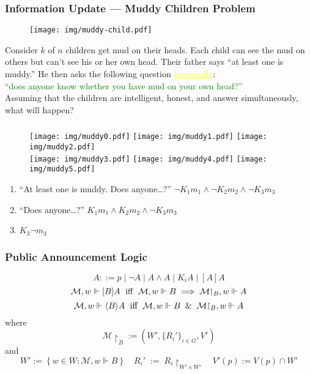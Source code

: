 \documentclass[UTF8,aspectratio=43,11pt,colorlinks,compress,openany]{beamer}%
\begin{document}
\begin{frame}\frametitle{Information Update --- Muddy Children Problem}
			\begin{figure}
				\texttt{[image: img/muddy-child.pdf]}
			\end{figure}\vspace{-1ex}
	\begin{problem}
		Consider $k$ of $n$ children get mud on their heads. Each child can see the mud on others but can't see his or her own head. Their father says ``at least one is muddy.'' He then asks the following question \textcolor{yellow}{\underline{repeatedly}}:\\
		\textcolor{green}{``does anyone know whether you have mud on your own head?''}\\
		Assuming that the children are intelligent, honest, and answer simultaneously, what will happen?
	\end{problem}
\end{frame}

\begin{frame}\frametitle{}
\begin{figure}[H]
\texttt{[image: img/muddy0.pdf]}
\texttt{[image: img/muddy1.pdf]}
\texttt{[image: img/muddy2.pdf]}\\
\texttt{[image: img/muddy3.pdf]}
\texttt{[image: img/muddy4.pdf]}\hspace*{2ex}
\texttt{[image: img/muddy5.pdf]}
\end{figure}
\begin{enumerate}
	\item ``At least one is muddy. Does anyone\dots?'' $\neg K_1m_1\wedge\neg K_2m_2\wedge\neg K_3m_3$
	\item ``Does anyone\dots?'' $K_1m_1\wedge K_2m_2\wedge\neg K_3m_3$
	\item $K_3\neg m_3$
\end{enumerate}
\end{frame}

\begin{frame}\frametitle{Public Announcement Logic}
\[A::=p\mid \neg A\mid A\wedge A\mid K_i A\mid [A]A\]
\[\mathcal{M},w\Vdash[B]A \mbox{\; iff \;} \mathcal{M},w\Vdash B\implies\mathcal{M}{\restriction_B},w\Vdash A\]
\[\mathcal{M},w\Vdash\langle B\rangle A \mbox{\; iff \;} \mathcal{M},w\Vdash B\;\;\&\;\;\mathcal{M}{\restriction_B},w\Vdash A\]
where
\[\mathcal{M}{\restriction_B}:=\left(W',\{R_i'\}_{i\in G},V'\right)\] and 
\[W':=\left\{w\in W: \mathcal{M},w\Vdash B\right\}\quad R_i'\;:=\;R_i\!{\restriction_{W'\times W'}} \quad V'(p):=V(p)\cap W'\]
\end{frame}
\end{document}
